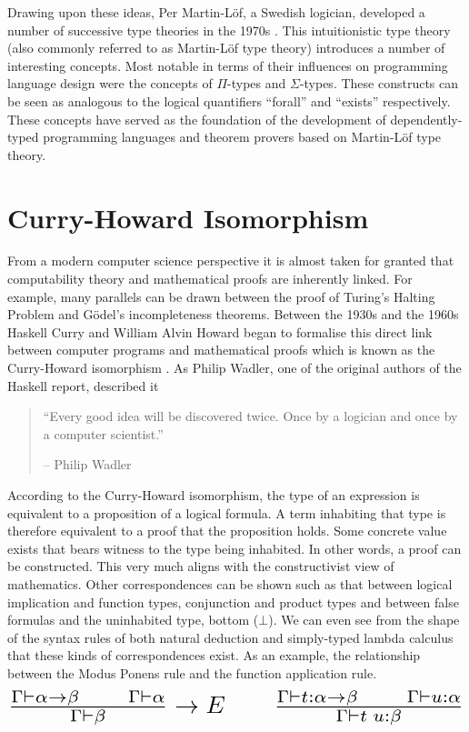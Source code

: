 \documentclass[a4paper, notitlepage]{report}
\begin{document}
Drawing upon these ideas, Per Martin-Löf, a Swedish logician, developed a number
of successive type theories in the 1970s \cite{martin-lof_intuitionistic_1984}.
This intuitionistic type theory (also commonly referred to as Martin-Löf type
theory) introduces a number of interesting concepts. Most notable in terms of
their influences on programming language design were the concepts of \(\Pi\)-types
and \(\Sigma\)-types. These constructs can be seen as analogous to the logical
quantifiers ``forall'' and ``exists'' respectively. These concepts have served
as the foundation of the development of dependently-typed programming languages
and theorem provers based on Martin-Löf type theory.

\section{Curry-Howard Isomorphism}
\label{sec:org8414ce9}
From a modern computer science perspective it is almost taken for granted that
computability theory and mathematical proofs are inherently linked. For example,
many parallels can be drawn between the proof of Turing's Halting Problem and
Gödel's incompleteness theorems. Between the 1930s and the 1960s Haskell Curry
and William Alvin Howard began to formalise this direct link between computer
programs and mathematical proofs which is known as the Curry-Howard isomorphism
\cite{mcadams_tutor_2013}. As Philip Wadler, one of the original authors of the
Haskell report, described it \cite{strange_loop_2015,wadler_propos_2015}

\begin{quote}
``Every good idea will be discovered twice. Once by a logician and once by a
computer scientist.''

\hfill-- Philip Wadler
\end{quote}

According to the Curry-Howard isomorphism, the type of an expression is
equivalent to a proposition of a logical formula. A term inhabiting that type is
therefore equivalent to a proof that the proposition holds. Some concrete value
exists that bears witness to the type being inhabited. In other words, a proof
can be constructed. This very much aligns with the constructivist view of
mathematics. Other correspondences can be shown such as that between logical
implication and function types, conjunction and product types and between false
formulas and the uninhabited type, bottom (\(\bot\)). We can even see from the
shape of the syntax rules of both natural deduction and simply-typed lambda
calculus that these kinds of correspondences exist. As an example, the
relationship between the Modus Ponens rule and the function application rule.
\[ \scalebox{2}{$\frac{\Gamma \vdash \alpha \rightarrow \beta \qquad \Gamma
\vdash \alpha}{\Gamma \vdash \beta} \rightarrow E \qquad \frac{\Gamma \vdash
t:\alpha \rightarrow \beta \qquad \Gamma \vdash u:\alpha}{\Gamma \vdash
t\;u:\beta}$} \]
\end{document}
